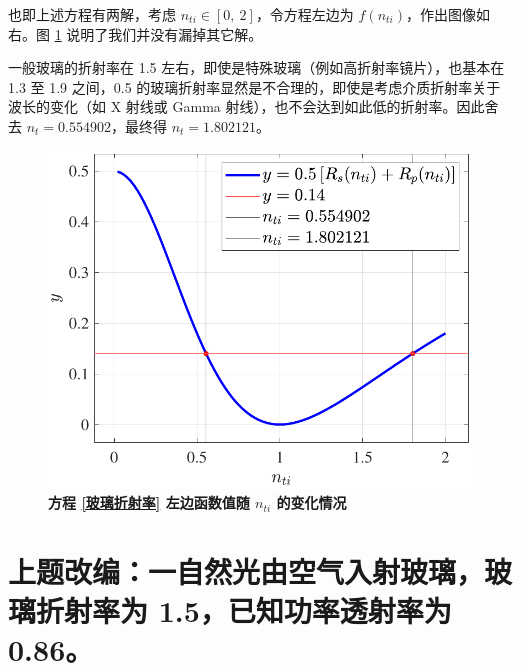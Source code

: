 \documentclass[UTF8]{report}
\theoremstyle{MyLineTheoremStyle} %
\theoremstyle{MyBlockTheoremStyle} %
\theoremstyle{MySubsubsectionStyle} %
\begin{document}
\begin{center}\noindent\begin{minipage}{0.50\textwidth}
\hspace*{2em} 也即上述方程有两解，考虑 $n_{ti} \in [0,\ 2]$，令方程左边为 $f(n_{ti})$，作出图像如右。图 \ref{方程左边的变化情况} 说明了我们并没有漏掉其它解。

\hspace*{2em} 一般玻璃的折射率在 1.5 左右，即使是特殊玻璃（例如高折射率镜片），也基本在 1.3 至 1.9 之间，0.5 的玻璃折射率显然是不合理的，即使是考虑介质折射率关于波长的变化（如 X 射线或 Gamma 射线），也不会达到如此低的折射率。因此舍去 $n_t = 0.554902$，最终得 $n_t = 1.802121$。
\end{minipage}\hfill\begin{minipage}{0.43\textwidth}
    \begin{figure}[H]\centering
        \includegraphics[width=\textwidth]{assets/2/2024-09-18_01-08-40.pdf}
        \vspace*{-9mm}
        \caption{\bfseries 方程 \ref{玻璃折射率} 左边函数值随 $n_{ti}$ 的变化情况}\label{方程左边的变化情况}
        \end{figure}
\end{minipage}\end{center}



\section*{上题改编：一自然光由空气入射玻璃，玻璃折射率为 1.5，已知功率透射率为 0.86。}
\end{document}
